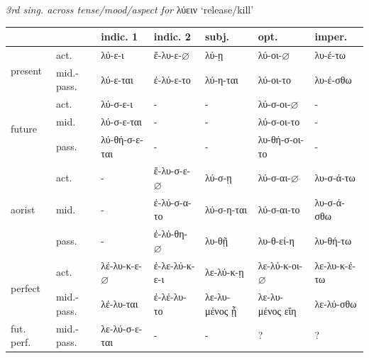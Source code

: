 \documentclass[]{ling-200b-2}
\begin{document}
\noindent \hfill \par
\ex[numoffset=\leftmargin] \textit{3rd sing. across tense/mood/aspect for} λύειν  `release/kill'
\xe
\scriptsize
\noindent \hfill \par
\noindent\begin{tabularx}{0.95\textwidth}{
l
l
| >{\centering\arraybackslash}X
>{\centering\arraybackslash}X
>{\centering\arraybackslash}X
>{\centering\arraybackslash}X
>{\centering\arraybackslash}X
}
& & indic. 1 & indic. 2 & subj. & opt. & imper. \\
\hline
\multirow{2}{3em}{present} & act. & λύ-ε-ι & ἔ-λυ-ε-$\varnothing$ & λύ-ῃ & λύ-οι-$\varnothing$ & λυ-έ-τω \\
 & mid.-pass. & λύ-ε-ται & ἐ-λύ-ε-το & λύ-η-ται & λύ-οι-το & λυ-έ-σθω \\
\hline
\multirow{3}{3em}{future} & act. & λύ-σ-ε-ι & - & - & λύ-σ-οι-$\varnothing$ & - \\
 & mid. & λύ-σ-ε-ται & - & - & λύ-σ-οι-το & - \\
 & \color{red} pass. & \color{red} λύ-θή-σ-ε-ται & - & - & \color{red} λυ-θή-σ-οι-το & - \\
\hline
\multirow{3}{3em}{aorist} & act. & - & ἔ-λυ-σ-ε-$\varnothing$ & λύ-σ-ῃ & λύ-σ-αι-$\varnothing$ & λυ-σ-ά-τω \\
 & mid. & - & ἐ-λύ-σ-α-το & λύ-σ-η-ται & λύ-σ-αι-το & λυ-σ-ά-σθω \\
 & \color{red} pass. & - & \color{red} ἐ-λύ-θη-$\varnothing$ & \color{red} λυ-θῇ & \color{red} λυ-θ-εί-η & \color{red} λυ-θή-τω \\
\hline
\multirow{2}{3em}{perfect} & act. & λέ-λυ-κ-ε-$\varnothing$ & ἐ-λε-λύ-κ-ε-ι & λε-λύ-κ-ῃ & λε-λύ-κ-οι-$\varnothing$ & λε-λυ-κ-έ-τω \\
 & mid.-pass. & λέ-λυ-ται & ἐ-λέ-λυ-το & λε-λυ-μένος ᾖ & λε-λυ-μένος εἴη & λε-λύ-σθω \\
 \hline
 fut. perf. & mid.-pass. & λε-λύ-σ-ε-ται & - & - & ? & ? \\

\end{tabularx}
\end{document}
